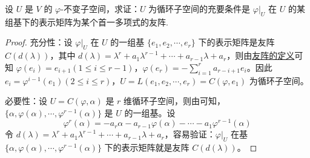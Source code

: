 \documentclass[../../main.tex]{subfiles}
\begin{document}
\begin{theorem}\label{theorem:不变子空间是循环子空间的充要条件}
设 \(U\) 是 \(V\) 的 \(\varphi\)-不变子空间，求证：\(U\) 为循环子空间的充要条件是 \(\varphi|_U\) 在 \(U\) 的某组基下的表示矩阵为某个首一多项式的友阵.
\end{theorem}
\begin{proof}
{\heiti 充分性：}设 \(\varphi|_U\) 在 \(U\) 的一组基 \(\{e_1,e_2,\cdots,e_r\}\) 下的表示矩阵是友阵 \(C(d(\lambda))\)，其中 \(d(\lambda)=\lambda^r + a_1\lambda^{r - 1}+\cdots + a_{r - 1}\lambda + a_r\)，则由\hyperref[proposition:多项式的友矩和Frobenius块]{友阵的定义}可知 \(\varphi(e_i)=e_{i + 1}(1\leqslant  i\leqslant  r - 1)\)，\(\varphi(e_r)=-\sum_{i = 1}^{r}a_{r - i + 1}e_i\)。因此 \(e_i=\varphi^{i - 1}(e_1)(2\leqslant  i\leqslant  r)\)，\(U = L(e_1,e_2,\cdots,e_r)=C(\varphi,e_1)\) 为循环子空间。

{\heiti 必要性：}设 \(U = C(\varphi,\alpha)\) 是 \(r\) 维循环子空间，则由可知，\(\{\alpha,\varphi(\alpha),\cdots,\varphi^{r - 1}(\alpha)\}\) 是 \(U\) 的一组基。设 
\[
\varphi^r(\alpha)=-a_r\alpha - a_{r - 1}\varphi(\alpha)-\cdots - a_1\varphi^{r - 1}(\alpha)
\]
令 \(d(\lambda)=\lambda^r + a_1\lambda^{r - 1}+\cdots + a_{r - 1}\lambda + a_r\)，容易验证：\(\varphi|_U\) 在基 \(\{\alpha,\varphi(\alpha),\cdots,\varphi^{r - 1}(\alpha)\}\) 下的表示矩阵就是友阵 \(C(d(\lambda))\)。
\end{proof}
\end{document}
